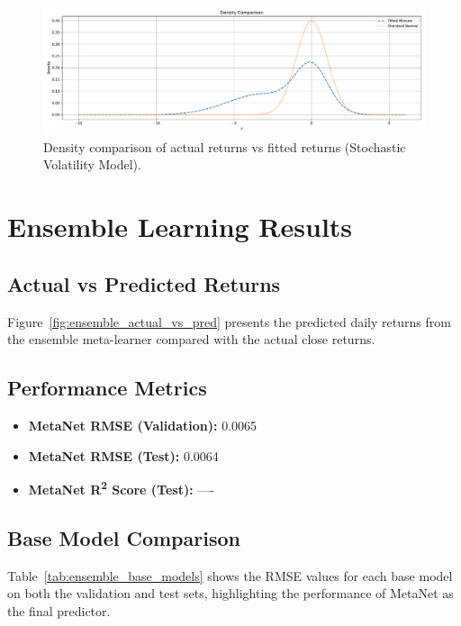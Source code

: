 \begin{figure}[h!]
    \centering
    \includegraphics[width=\textwidth]{Images/stochastic_volatility_density.pdf}
    \caption{Density comparison of actual returns vs fitted returns (Stochastic Volatility Model).}
    \label{fig:sv_density}
\end{figure}

\section{Ensemble Learning Results}

\subsection{Actual vs Predicted Returns}
Figure~\ref{fig:ensemble_actual_vs_pred} presents the predicted daily returns from the ensemble meta-learner compared with the actual close returns.

\subsection{Performance Metrics}
\begin{itemize}
    \item \textbf{MetaNet RMSE (Validation):} 0.0065
    \item \textbf{MetaNet RMSE (Test):} 0.0064
    \item \textbf{MetaNet R\textsuperscript{2} Score (Test):} ----
\end{itemize}

\subsection{Base Model Comparison}
Table~\ref{tab:ensemble_base_models} shows the RMSE values for each base model on both the validation and test sets, highlighting the performance of MetaNet as the final predictor.


